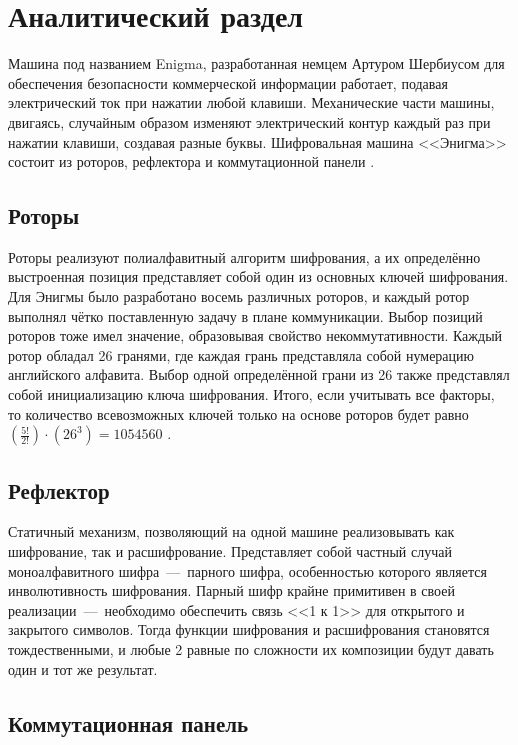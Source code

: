 \chapter{Аналитический раздел}

Машина под названием Enigma, разработанная немцем Артуром Шербиусом для обеспечения безопасности коммерческой информации работает, подавая электрический ток при нажатии любой клавиши. Механические части машины,  двигаясь, случайным образом изменяют электрический контур каждый раз при нажатии клавиши, создавая разные буквы. Шифровальная машина <<Энигма>> состоит из роторов, рефлектора и коммутационной панели \cite{bib2}.

\section{Роторы}

Роторы реализуют полиалфавитный алгоритм шифрования, а их определённо выстроенная позиция представляет собой один из основных ключей шифрования. Для Энигмы было разработано восемь различных роторов, и каждый ротор выполнял чётко поставленную задачу в плане коммуникации. Выбор позиций роторов тоже имел значение, образовывая свойство некоммутативности. Каждый ротор обладал 26 гранями, где каждая грань представляла собой нумерацию английского алфавита. Выбор одной определённой грани из 26 также представлял собой инициализацию ключа шифрования. Итого, если учитывать все факторы, то количество всевозможных ключей только на основе роторов будет равно $(\frac{5!}{2!}) \cdot (26^3) = 1 054 560$ \cite{enigma}. 

\section{Рефлектор}

Статичный механизм, позволяющий на одной машине реализовывать как шифрование, так и расшифрование. Представляет собой частный случай моноалфавитного шифра~---~парного шифра, особенностью которого является инволютивность шифрования. Парный шифр крайне примитивен в своей реализации~---~необходимо обеспечить связь <<1 к 1>> для открытого и закрытого символов. Тогда функции шифрования и расшифрования становятся тождественными, и любые 2 равные по сложности их композиции будут давать один и тот же результат.

\section{Коммутационная панель}

